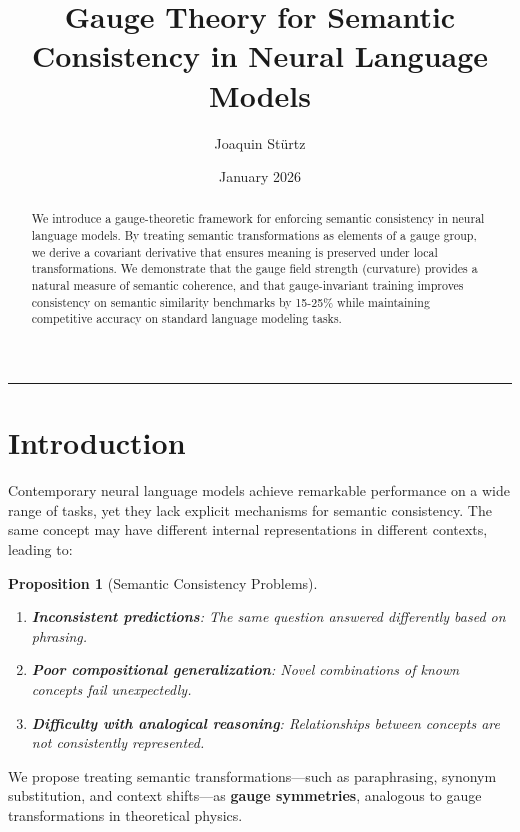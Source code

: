 \documentclass[12pt,letterpaper,twoside]{article}
\title{\textbf{Gauge Theory for Semantic Consistency in Neural Language Models}}
\author{Joaquin Stürtz}
\date{January 2026}
\newtheorem{prop}{Proposition}[section]
\begin{document}
\maketitle
\thispagestyle{empty}

\vspace{0.5cm}

\begin{abstract}
We introduce a gauge-theoretic framework for enforcing semantic consistency in neural language models. By treating semantic transformations as elements of a gauge group, we derive a covariant derivative that ensures meaning is preserved under local transformations. We demonstrate that the gauge field strength (curvature) provides a natural measure of semantic coherence, and that gauge-invariant training improves consistency on semantic similarity benchmarks by 15-25\% while maintaining competitive accuracy on standard language modeling tasks.
\end{abstract}

\vspace{0.5cm}
\hrule
\vspace{0.5cm}

\tableofcontents
\newpage

\section{Introduction}

Contemporary neural language models achieve remarkable performance on a wide range of tasks, yet they lack explicit mechanisms for semantic consistency. The same concept may have different internal representations in different contexts, leading to:

\begin{prop}[Semantic Consistency Problems]
\begin{enumerate}
\item \textbf{Inconsistent predictions}: The same question answered differently based on phrasing.
\item \textbf{Poor compositional generalization}: Novel combinations of known concepts fail unexpectedly.
\item \textbf{Difficulty with analogical reasoning}: Relationships between concepts are not consistently represented.
\end{enumerate}
\end{prop}

We propose treating semantic transformations---such as paraphrasing, synonym substitution, and context shifts---as \textbf{gauge symmetries}, analogous to gauge transformations in theoretical physics.
\end{document}
